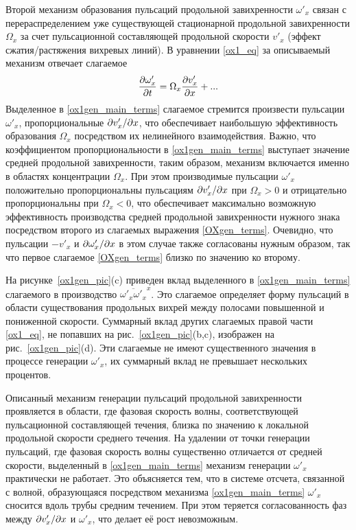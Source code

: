 Второй механизм образования пульсаций продольной завихренности $\omega'_x$ связан с перераспределением уже существующей стационарной продольной завихренности $\Omega_x$ за счет пульсационной составляющей продольной скорости $v'_x$ (эффект сжатия/растяжения вихревых линий). В уравнении \eqref{ox1_eq} за описываемый механизм отвечает слагаемое
\begin{equation}\label{ox1gen_main_terms}
\frac{\partial \omega'_x}{\partial t} = \Omega_x \frac {\partial v'_x}{\partial x} + ...
\end{equation}
Выделенное в \eqref{ox1gen_main_terms} слагаемое стремится произвести пульсации $\omega'_x$, пропорциональные $\partial v'_x / \partial x$, что обеспечивает наибольшую эффективность образования $\Omega_x$ посредством их нелинейного взаимодействия. Важно, что коэффициентом пропорциональности в \eqref{ox1gen_main_terms} выступает значение средней продольной завихренности, таким образом, механизм включается именно в областях концентрации $\Omega_x$. При этом производимые пульсации $\omega'_x$ положительно пропорциональны пульсациям  $\partial v'_x / \partial x$ при $\Omega_x>0$ и отрицательно пропорциональны при $\Omega_x<0$, что обеспечивает максимально возможную эффективность производства средней продольной завихренности нужного знака посредством второго из слагаемых выражения \eqref{OXgen_terms}. Очевидно, что пульсации $-v'_x$ и $\partial \omega'_x / \partial x$ в этом случае также согласованы нужным образом, так что первое слагаемое \eqref{OXgen_terms} близко по значению ко второму.

На рисунке~\ref{ox1gen_pic}(c) приведен вклад выделенного в \eqref{ox1gen_main_terms} слагаемого в производство $\overline{\omega'_x \omega'_x}^x$. Это слагаемое определяет форму пульсаций в области существования продольных вихрей между полосами повышенной и пониженной скорости. Суммарный вклад других слагаемых правой части \eqref{ox1_eq}, не попавших на рис.~\ref{ox1gen_pic}(b,c), изображен на рис.~\ref{ox1gen_pic}(d). Эти слагаемые не имеют существенного значения в процессе генерации $\omega'_x$, их суммарный вклад не превышает нескольких процентов. 

Описанный механизм генерации пульсаций продольной завихренности проявляется в области, где фазовая скорость волны, соответствующей пульсационной составляющей течения, близка по значению к локальной продольной скорости среднего течения. На удалении от точки генерации пульсаций, где фазовая скорость волны существенно отличается от средней скорости, выделенный в \eqref{ox1gen_main_terms} механизм генерации $\omega'_x$ практически не работает. Это объясняется тем, что в системе отсчета, связанной с волной, образующаяся посредством механизма \eqref{ox1gen_main_terms} $\omega'_x$ сносится вдоль трубы средним течением. При этом теряется согласованность фаз между $\partial v'_x / \partial x$ и $\omega'_x$, что делает её рост невозможным. 



